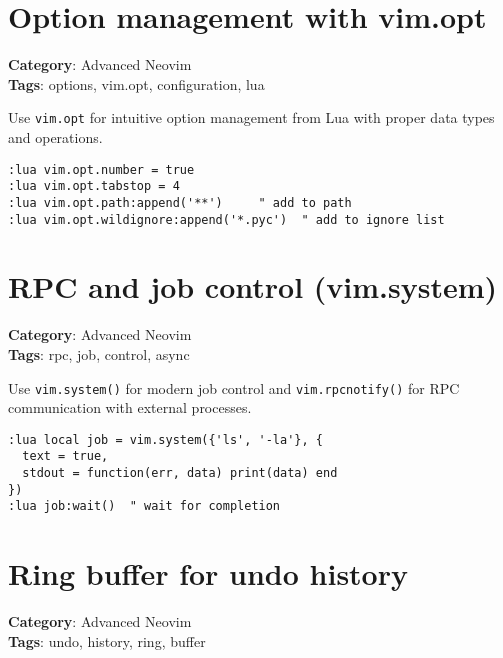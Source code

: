 \section{Option management with vim.opt}

\textbf{Category}: Advanced Neovim\\ \textbf{Tags}: options, vim.opt, configuration, lua
\vspace{0.5cm}

Use {\footnotesize \Verb§vim.opt§} for intuitive option management from Lua with proper data types and operations.

\begin{Exa*}{}
\begin{Verbatim}[fontsize=\footnotesize, breaklines, breakanywhere]
:lua vim.opt.number = true
:lua vim.opt.tabstop = 4
:lua vim.opt.path:append('**')     " add to path
:lua vim.opt.wildignore:append('*.pyc')  " add to ignore list
\end{Verbatim}
\end{Exa*}

\section{RPC and job control (vim.system)}

\textbf{Category}: Advanced Neovim\\ \textbf{Tags}: rpc, job, control, async
\vspace{0.5cm}

Use {\footnotesize \Verb§vim.system()§} for modern job control and {\footnotesize \Verb§vim.rpcnotify()§} for RPC communication with external processes.

\begin{Exa*}{}
\begin{Verbatim}[fontsize=\footnotesize, breaklines, breakanywhere]
:lua local job = vim.system({'ls', '-la'}, {
  text = true,
  stdout = function(err, data) print(data) end
})
:lua job:wait()  " wait for completion
\end{Verbatim}
\end{Exa*}

\section{Ring buffer for undo history}

\textbf{Category}: Advanced Neovim\\ \textbf{Tags}: undo, history, ring, buffer
\vspace{0.5cm}

